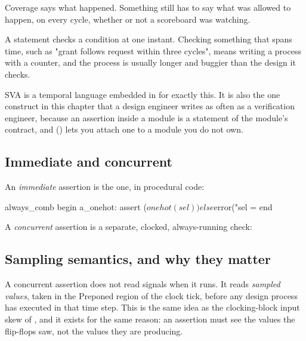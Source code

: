Coverage says what happened. Something still has to say what was allowed to
happen, on every cycle, whether or not a scoreboard was watching.

A \VHDL{}  statement checks a condition
at one instant. Checking something that spans time, such as "grant follows
request within three cycles", means writing a process with a counter, and the
process is usually longer and buggier than the design it checks.

SVA is a temporal language embedded in \SV{} for exactly this. It is also the
one construct in this chapter that a design engineer writes as often as a
verification engineer, because an assertion inside a module is a statement of
the module's contract, and  () lets you
attach one to a module you do not own.

\subsection{Immediate and concurrent}

An \emph{immediate} assertion is the \VHDL{} one, in procedural code:

\begin{svcode}
always_comb begin
  a_onehot: assert ($onehot(sel))
    else $error("sel = %
end
\end{svcode}

A \emph{concurrent} assertion is a separate, clocked, always-running check:


\subsection{Sampling semantics, and why they matter}

A concurrent assertion does not read signals when it runs. It reads
\emph{sampled values}, taken in the Preponed region of the clock tick, before
any design process has executed in that time step. This is the same idea as
the clocking-block input skew of , and it exists for
the same reason: an assertion must see the values the flip-flops saw, not the
values they are producing.

